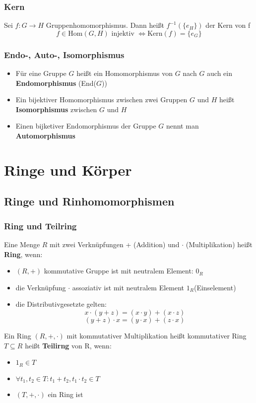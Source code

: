 \documentclass{kit}
\begin{document}
    \subsubsection{Kern}
      Sei $f:G\longrightarrow H$ Gruppenhomomorphismus. Dann heißt $f^{-1}(\{e_H\})$ der Kern von f
      $$f\in\text{Hom}(G,H)\text{ injektiv }\Leftrightarrow\text{Kern}(f)=\{e_G\}$$
    \subsubsection{Endo-, Auto-, Isomorphismus}
      \begin{itemize}
        \item Für eine Gruppe $G$ heißt ein Homomorphismus von $G$ nach $G$ auch ein \textbf{Endomorphismus} (End($G$))
        \item Ein bijektiver Homomorphismus zwischen zwei Gruppen $G$ und $H$ heißt \textbf{Isomorphismus} zwischen $G$ und $H$
      \item Einen bijketiver Endomorphismus der Gruppe $G$ nennt man \textbf{Automorphismus}
      \end{itemize}
\section{Ringe und Körper}
  \subsection{Ringe und Rinhomomorphismen}
    \subsubsection{Ring und Teilring}
      Eine Menge $R$ mit zwei Verknüpfungen + (Addition) und $\cdot$ (Multiplikation) heißt \textbf{Ring}, wenn:
      \begin{itemize}
        \item $(R,+)$ kommutative Gruppe ist mit neutralem Element: $0_R$
        \item die Verknüpfung $\cdot$ assoziativ ist mit neutralem Element $1_R$(Einselement)
        \item die Distributivgesetzte gelten:
          $$x\cdot(y+z)=(x\cdot y)+(x\cdot z)$$
          $$(y+z)\cdot x=(y\cdot x)+(z\cdot x)$$
      \end{itemize}
      Ein Ring $(R,+,\cdot)$ mit kommutativer Multiplikation heißt kommutativer Ring\\
      $T\subseteq R$ heißt \textbf{Teilirng} von R, wenn:
      \begin{itemize}
        \item $1_R\in T$
        \item $\forall t_1,t_2\in T:t_1+t_2,t_1\cdot t_2\in T$
        \item $(T,+,\cdot)$ ein Ring ist
      \end{itemize}
\end{document}
